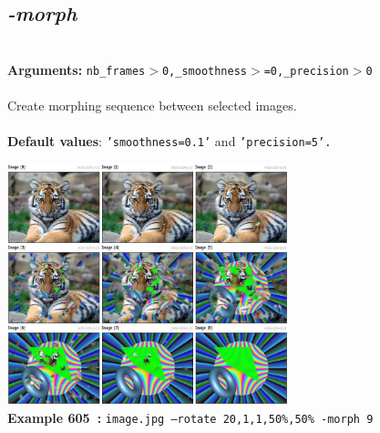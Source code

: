 \documentclass[a4paper,11pt,twoside]{book}
\begin{document}
\subsection{\emph{-morph} }\vspace*{-0.5em}
~\\\textbf{Arguments: } 
{\small \texttt{nb\_frames$>$0,\_smoothness$>$=0,\_precision$>$0}}\\~\\
Create morphing sequence between selected images.
~\\~\\\textbf{Default values}: {\small \texttt{'smoothness=0.1'} and \texttt{'precision=5'.}}
\begin{center}\includegraphics[keepaspectratio=true,height=7cm,width=\textwidth]{img/gmic_def605.jpg}\\
{\footnotesize \textbf{Example 605~:} \texttt{image.jpg --rotate 20,1,1,50\%,50\% -morph 9}}
\end{center}
\end{document}
